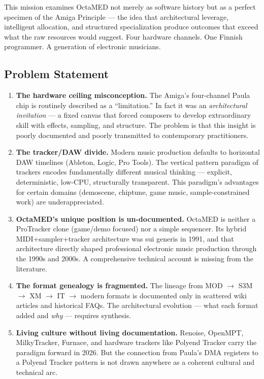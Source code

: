 \documentclass[11pt,letterpaper]{article}
\begin{document}
This mission examines OctaMED not merely as software history but as a perfect specimen of the Amiga Principle --- the idea that architectural leverage, intelligent allocation, and structured specialization produce outcomes that exceed what the raw resources would suggest. Four hardware channels. One Finnish programmer. A generation of electronic musicians.

\subsection{Problem Statement}

\begin{enumerate}[leftmargin=1.5em]
  \item \textbf{The hardware ceiling misconception.} The Amiga's four-channel Paula chip is routinely described as a ``limitation.'' In fact it was an \textit{architectural invitation} --- a fixed canvas that forced composers to develop extraordinary skill with effects, sampling, and structure. The problem is that this insight is poorly documented and poorly transmitted to contemporary practitioners.

  \item \textbf{The tracker/DAW divide.} Modern music production defaults to horizontal DAW timelines (Ableton, Logic, Pro Tools). The vertical pattern paradigm of trackers encodes fundamentally different musical thinking --- explicit, deterministic, low-CPU, structurally transparent. This paradigm's advantages for certain domains (demoscene, chiptune, game music, sample-constrained work) are underappreciated.

  \item \textbf{OctaMED's unique position is un-documented.} OctaMED is neither a ProTracker clone (game/demo focused) nor a simple sequencer. Its hybrid MIDI+sampler+tracker architecture was sui generis in 1991, and that architecture directly shaped professional electronic music production through the 1990s and 2000s. A comprehensive technical account is missing from the literature.

  \item \textbf{The format genealogy is fragmented.} The lineage from MOD $\to$ S3M $\to$ XM $\to$ IT $\to$ modern formats is documented only in scattered wiki articles and historical FAQs. The architectural evolution --- what each format added and \textit{why} --- requires synthesis.

  \item \textbf{Living culture without living documentation.} Renoise, OpenMPT, MilkyTracker, Furnace, and hardware trackers like Polyend Tracker carry the paradigm forward in 2026. But the connection from Paula's DMA registers to a Polyend Tracker pattern is not drawn anywhere as a coherent cultural and technical arc.
\end{enumerate}
\end{document}
